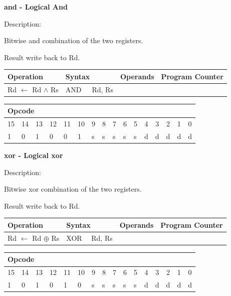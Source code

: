\documentclass[%
	pdftex,
	a4paper,
	oneside,
	bibtotoc,%
	idxtotoc,%
	bibtotocnumbered,
	halfparskip,%
]{scrbook}
\begin{document}
\bigskip

\textbf{and - Logical And}

Description:

Bitwise and combination of the two registers.

Result write back to Rd.

\begin{tabular}{|l|l|l|l|}
\hline
Operation & Syntax & Operands & Program Counter \\ \hline
Rd $\leftarrow $ Rd $\wedge $ Rs & AND\ \ \ Rd, Rs &  &  \\ \hline
\end{tabular}

\begin{tabular}{|c|c|c|c|c|c|c|c|c|c|c|c|c|c|c|c|}
\hline
\multicolumn{6}{|l|}{Opcode} & \multicolumn{5}{|l|}{} & \multicolumn{5}{|l|}{
} \\ \hline
15 & 14 & 13 & 12 & 11 & 10 & 9 & 8 & 7 & 6 & 5 & 4 & 3 & 2 & 1 & 0 \\ \hline
\multicolumn{1}{|l|}{1} & \multicolumn{1}{|l|}{0} & \multicolumn{1}{|l|}{1}
& \multicolumn{1}{|l|}{0} & \multicolumn{1}{|l|}{0} & \multicolumn{1}{|l|}{1}
& \multicolumn{1}{|l|}{s} & \multicolumn{1}{|l|}{s} & \multicolumn{1}{|l|}{s}
& \multicolumn{1}{|l|}{s} & \multicolumn{1}{|l|}{s} & \multicolumn{1}{|l|}{d}
& \multicolumn{1}{|l|}{d} & \multicolumn{1}{|l|}{d} & \multicolumn{1}{|l|}{d}
& \multicolumn{1}{|l|}{d} \\ \hline
\end{tabular}

\bigskip

\textbf{xor - Logical xor}

Description:

Bitwise xor combination of the two registers.

Result write back to Rd.

\begin{tabular}{|l|l|l|l|}
\hline
Operation & Syntax & Operands & Program Counter \\ \hline
Rd $\leftarrow $ Rd $\oplus $ Rs & XOR \ \ Rd, Rs &  &  \\ \hline
\end{tabular}

\begin{tabular}{|c|c|c|c|c|c|c|c|c|c|c|c|c|c|c|c|}
\hline
\multicolumn{6}{|l|}{Opcode} & \multicolumn{5}{|l|}{} & \multicolumn{5}{|l|}{
} \\ \hline
15 & 14 & 13 & 12 & 11 & 10 & 9 & 8 & 7 & 6 & 5 & 4 & 3 & 2 & 1 & 0 \\ \hline
\multicolumn{1}{|l|}{1} & \multicolumn{1}{|l|}{0} & \multicolumn{1}{|l|}{1}
& \multicolumn{1}{|l|}{0} & \multicolumn{1}{|l|}{1} & \multicolumn{1}{|l|}{0}
& \multicolumn{1}{|l|}{s} & \multicolumn{1}{|l|}{s} & \multicolumn{1}{|l|}{s}
& \multicolumn{1}{|l|}{s} & \multicolumn{1}{|l|}{s} & \multicolumn{1}{|l|}{d}
& \multicolumn{1}{|l|}{d} & \multicolumn{1}{|l|}{d} & \multicolumn{1}{|l|}{d}
& \multicolumn{1}{|l|}{d} \\ \hline
\end{tabular}
\end{document}
